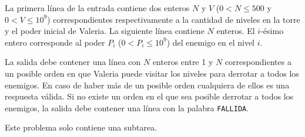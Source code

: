 \documentclass{oci}
\newcommand{\swordred}{\hspace{0.1em}\raisebox{-0.2em}{\texttt{[image: sword-red]}}}
\newcommand{\swordblue}{\raisebox{-0.2em}{\texttt{[image: sword-blue]}}}
\begin{document}
\begin{problemDescription}
\begin{center}
{
  }
  \end{center}
\end{problemDescription}

\begin{inputDescription}
  La primera línea de la entrada contiene dos enteros $N$ y $V$ ($0 < N \leq 500$ y $0 < V \leq 10^9$)
  correspondientes respectivamente a la cantidad de niveles en la torre y el poder inicial de Valeria.
  La siguiente línea contiene $N$ enteros.
  El $i$-ésimo entero corresponde al poder $P_i$ ($0 < P_i \leq 10^9$) del enemigo en el nivel $i$.
\end{inputDescription}

\begin{outputDescription}
  La salida debe contener una línea con $N$ enteros entre 1 y $N$ correspondientes a un posible orden
  en que Valeria puede visitar los niveles para derrotar a todos los enemigos.
  En caso de haber más de un posible orden cualquiera de ellos es una respuesta válida.
  Si no existe un orden en el que sea posible derrotar a todos los enemigos, la salida debe contener
  una línea con la palabra \texttt{FALLIDA}.
\end{outputDescription}

\begin{scoreDescription}
  Este problema solo contiene una subtarea.
\end{scoreDescription}

\begin{sampleDescription}
\end{sampleDescription}
\end{document}
